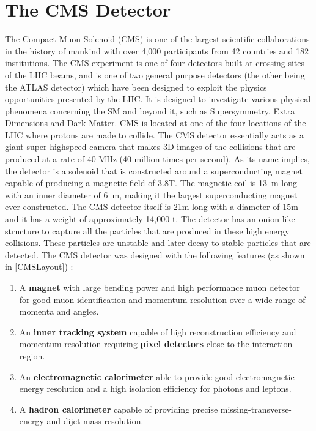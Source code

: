 \chapter{The CMS Detector\label{ch:CMS}}

The Compact Muon Solenoid (CMS) is one of the largest scientific collaborations in the history of mankind with over 4,000 participants from 42 countries and 182 institutions.
The CMS experiment is one of four detectors built at crossing sites of the LHC beams, and is one of two general purpose detectors (the other being the ATLAS detector) which have been designed to exploit the physics opportunities presented by the LHC.
It is designed to investigate various physical phenomena concerning the SM and beyond it, such as Supersymmetry, Extra Dimensions and Dark Matter.
CMS is located at one of the four locations of the LHC where protons are made to collide. The CMS detector essentially acts as a giant super highspeed camera that makes 3D images of the collisions that are produced at a rate of 40 MHz (40 million times per second).
As its name implies, the detector is a solenoid that is constructed around a superconducting magnet capable of producing a magnetic field of 3.8\unit{\tesla}.
The magnetic coil is \qty{13}{\m} long with an inner diameter of \qty{6}{\meter}, making it the largest superconducting magnet ever constructed.
The CMS detector itself is 21m long with a diameter of 15m and it has a weight of approximately 14,000 \unit{\tonne}.
The detector has an onion-like structure to capture all the particles that are produced in these high energy collisions. These particles are unstable and later decay to stable particles that are detected.  The CMS detector was designed with the following features (as shown in \autoref{CMSLayout}) :

\begin{enumerate}
	\item{A \textbf{magnet} with large bending power and high performance muon detector for good muon
	      identification and momentum resolution over a wide range of momenta and angles.}

	\item{An \textbf{inner tracking system} capable of high reconstruction efficiency and momentum resolution
	      requiring \textbf{pixel detectors} close to the interaction region.}

	\item{An \textbf{electromagnetic calorimeter} able to provide good electromagnetic energy resolution and
	      a high isolation efficiency for photons and leptons.}

	\item{A \textbf{hadron calorimeter} capable of providing precise missing-transverse-energy and dijet-mass
	      resolution.}

\end{enumerate}

